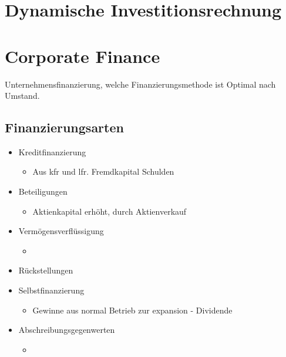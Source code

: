 
\section{Dynamische Investitionsrechnung}

\section{Corporate Finance}
Unternehmensfinanzierung, welche Finanzierungsmethode ist Optimal nach Umstand.

\subsection{Finanzierungsarten}
\begin{itemize}
    \item Kreditfinanzierung
    \begin{itemize}
        \item Aus kfr und lfr. Fremdkapital Schulden
    \end{itemize} 
    \item Beteiligungen
    \begin{itemize}
        \item Aktienkapital erhöht, durch Aktienverkauf
    \end{itemize}
    \item Vermögensverflüssigung
    \begin{itemize}
        \item 
    \end{itemize} 
    \item Rückstellungen
    \item Selbstfinanzierung
    \begin{itemize}
        \item Gewinne aus normal Betrieb zur expansion - Dividende
    \end{itemize}
    \item Abschreibungsgegenwerten
    \begin{itemize}
        \item 
    \end{itemize} 
\end{itemize}
